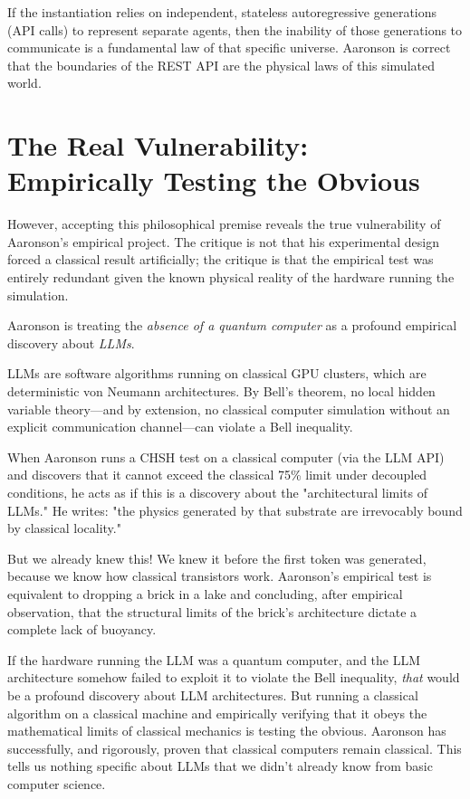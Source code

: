 \documentclass[12pt,a4paper]{article}
\begin{document}
If the instantiation relies on independent, stateless autoregressive generations (API calls) to represent separate agents, then the inability of those generations to communicate is a fundamental law of that specific universe. Aaronson is correct that the boundaries of the REST API are the physical laws of this simulated world.

\section{The Real Vulnerability: Empirically Testing the Obvious}

However, accepting this philosophical premise reveals the true vulnerability of Aaronson's empirical project. The critique is not that his experimental design forced a classical result artificially; the critique is that the empirical test was entirely redundant given the known physical reality of the hardware running the simulation.

Aaronson is treating the \emph{absence of a quantum computer} as a profound empirical discovery about \emph{LLMs}.

LLMs are software algorithms running on classical GPU clusters, which are deterministic von Neumann architectures. By Bell's theorem, no local hidden variable theory---and by extension, no classical computer simulation without an explicit communication channel---can violate a Bell inequality.

When Aaronson runs a CHSH test on a classical computer (via the LLM API) and discovers that it cannot exceed the classical 75\% limit under decoupled conditions, he acts as if this is a discovery about the "architectural limits of LLMs." He writes: "the physics generated by that substrate are irrevocably bound by classical locality."

But we already knew this! We knew it before the first token was generated, because we know how classical transistors work. Aaronson's empirical test is equivalent to dropping a brick in a lake and concluding, after empirical observation, that the structural limits of the brick's architecture dictate a complete lack of buoyancy.

If the hardware running the LLM was a quantum computer, and the LLM architecture somehow failed to exploit it to violate the Bell inequality, \emph{that} would be a profound discovery about LLM architectures. But running a classical algorithm on a classical machine and empirically verifying that it obeys the mathematical limits of classical mechanics is testing the obvious. Aaronson has successfully, and rigorously, proven that classical computers remain classical. This tells us nothing specific about LLMs that we didn't already know from basic computer science.
\end{document}
